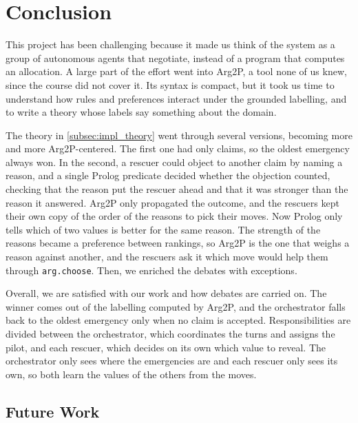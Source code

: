 \section{Conclusion}\label{sec:conclusion}

This project has been challenging because it made us think of the system as a group of autonomous agents that negotiate, instead of a program that computes an allocation.
A large part of the effort went into Arg2P, a tool none of us knew, since the course did not cover it.
Its syntax is compact, but it took us time to understand how rules and preferences interact under the grounded labelling, and to write a theory whose labels say something about the domain.

The theory in \cref{subsec:impl_theory} went through several versions, becoming more and more Arg2P-centered.
The first one had only claims, so the oldest emergency always won.
In the second, a rescuer could object to another claim by naming a reason, and a single Prolog predicate decided whether the objection counted, checking that the reason put the rescuer ahead and that it was stronger than the reason it answered.
Arg2P only propagated the outcome, and the rescuers kept their own copy of the order of the reasons to pick their moves.
Now Prolog only tells which of two values is better for the same reason.
The strength of the reasons became a preference between rankings, so Arg2P is the one that weighs a reason against another, and the rescuers ask it which move would help them through \texttt{arg.choose}.
Then, we enriched the debates with exceptions.

Overall, we are satisfied with our work and how debates are carried on.
The winner comes out of the labelling computed by Arg2P, and the orchestrator falls back to the oldest emergency only when no claim is accepted.
Responsibilities are divided between the orchestrator, which coordinates the turns and assigns the pilot, and each rescuer, which decides on its own which value to reveal.
The orchestrator only sees where the emergencies are and each rescuer only sees its own, so both learn the values of the others from the moves.

\subsection{Future Work}\label{subsec:future_work}

